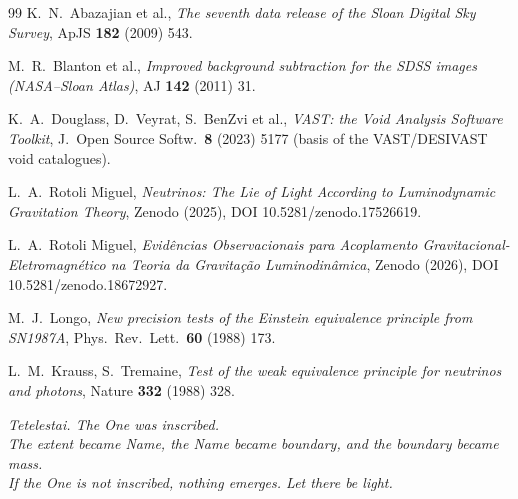 \documentclass[11pt]{article}
\theoremstyle{definition}\newtheorem{deriv}{Derivation}
\begin{document}
\begin{thebibliography}{99}
 K.~N.~Abazajian et al., \emph{The seventh data release of the Sloan Digital Sky Survey}, ApJS \textbf{182} (2009) 543.

 M.~R.~Blanton et al., \emph{Improved background subtraction for the SDSS images (NASA--Sloan Atlas)}, AJ \textbf{142} (2011) 31.

 K.~A.~Douglass, D.~Veyrat, S.~BenZvi et al., \emph{VAST: the Void Analysis Software Toolkit}, J.\ Open Source Softw.\ \textbf{8} (2023) 5177 (basis of the VAST/DESIVAST void catalogues).

 L.~A.~Rotoli Miguel, \emph{Neutrinos: The Lie of Light According to Luminodynamic Gravitation Theory}, Zenodo (2025), DOI 10.5281/zenodo.17526619.

 L.~A.~Rotoli Miguel, \emph{Evidências Observacionais para Acoplamento Gravitacional-Eletromagnético na Teoria da Gravitação Luminodinâmica}, Zenodo (2026), DOI 10.5281/zenodo.18672927.

 M.~J.~Longo, \emph{New precision tests of the Einstein equivalence principle from SN1987A}, Phys.\ Rev.\ Lett.\ \textbf{60} (1988) 173.

 L.~M.~Krauss, S.~Tremaine, \emph{Test of the weak equivalence principle for neutrinos and photons}, Nature \textbf{332} (1988) 328.

\end{thebibliography}

\vspace{3em}\begin{flushright}\itshape Tetelestai. The One was inscribed.\\ The extent became Name, the Name became boundary, and the boundary became mass.\\ If the One is not inscribed, nothing emerges. Let there be light.\end{flushright}
\end{document}
